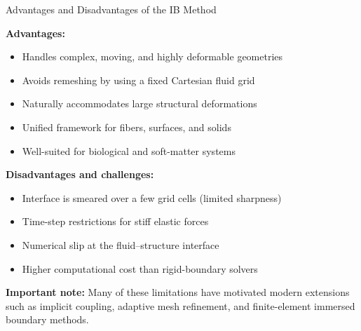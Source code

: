 \documentclass{beamer}
\begin{document}
\begin{frame}{Advantages and Disadvantages of the IB Method}
\small

\textbf{Advantages:}
\begin{itemize}
    \item Handles complex, moving, and highly deformable geometries
    \item Avoids remeshing by using a fixed Cartesian fluid grid
    \item Naturally accommodates large structural deformations
    \item Unified framework for fibers, surfaces, and solids
    \item Well-suited for biological and soft-matter systems
\end{itemize}

\medskip
\textbf{Disadvantages and challenges:}
\begin{itemize}
    \item Interface is smeared over a few grid cells (limited sharpness)
    \item Time-step restrictions for stiff elastic forces
    \item Numerical slip at the fluid--structure interface
    \item Higher computational cost than rigid-boundary solvers
\end{itemize}

\medskip
\textbf{Important note:}
Many of these limitations have motivated modern extensions such as
implicit coupling, adaptive mesh refinement, and finite-element
immersed boundary methods.
\end{frame}
\end{document}
